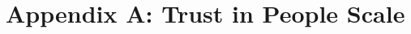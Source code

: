 \documentclass[ 12 pt]{article}
\begin{document}



\clearpage




\appendix
\section*{Appendix A: Trust in People Scale}



\clearpage
\thispagestyle{empty}

\listoffigures

\listoftables

\newpage


% 
% 





% 

% 
\end{document}
